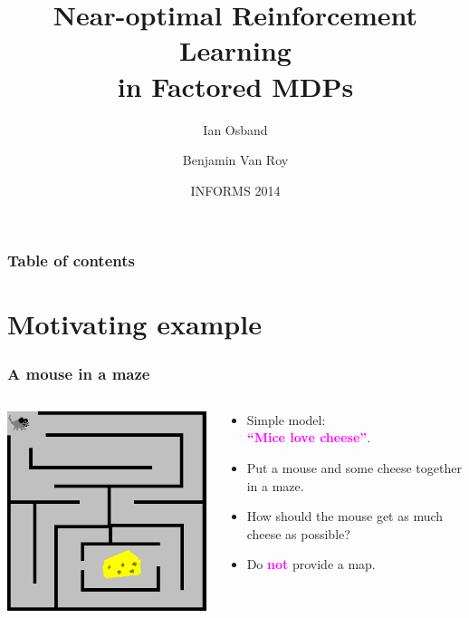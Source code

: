 \documentclass{beamer}
\title{Near-optimal Reinforcement Learning \\ in Factored MDPs}
\author{Ian Osband \and Benjamin Van Roy}
\institute{Mangement Science and Engineering \\
Stanford University \\
iosband@stanford.edu}
\date{INFORMS 2014}
\newlength{\wideitemsep}
\let\olditem\item
\renewcommand{\item}{\setlength{\itemsep}{\wideitemsep}\olditem}
\newcommand{\bspace}{\vspace{3mm}}
\newcommand{\hilite}[1]{\textcolor{magenta}{\textbf{#1}}}
\begin{document}
\maketitle

\begin{frame}
\frametitle{Table of contents}
\tableofcontents
\end{frame}

\section{Motivating example}

\begin{frame}
\frametitle{A mouse in a maze}
  \begin{columns}[T]
    \begin{column}{.5\textwidth}
        \includegraphics[width=\textwidth]{./media/mazeCheese}
    \end{column}

    \begin{column}{.5\textwidth}
    \begin{itemize}
        \item Simple model: \\ \hilite{``Mice love cheese''}.
        \bspace
        \item Put a mouse and some cheese together in a maze.
        \bspace
        \item How should the mouse get as much cheese as possible?
        \bspace
        \pause
        \item Do \hilite{not} provide a map.
    \end{itemize}
    \end{column}
  \end{columns}
\end{frame}
\end{document}
